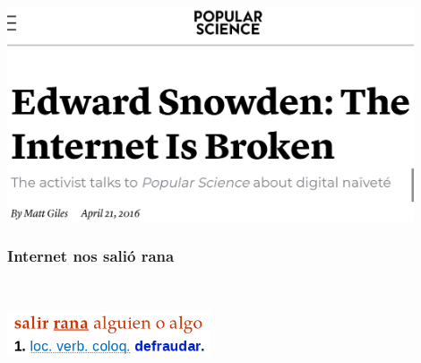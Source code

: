 \begin{frame}[fragile]

  \begin{center}
  \includegraphics[width=12cm]{figs/snowden-internet}
  \end{center}

\end{frame}

\begin{frame}[fragile]
  \frametitle{Internet nos salió rana}

  ~
  \vspace{2cm}
  \begin{flushright}
  \includegraphics[width=6cm]{figs/salir-rana}
  \end{flushright}

\end{frame}


